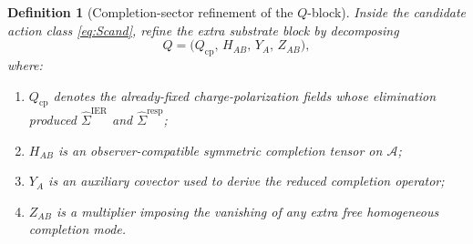 \documentclass[11pt]{article}
\newcommand{\Sub}{\mathcal A}
\newcommand{\BaseLift}{\widehat\Sigma^{\mathrm{IER}}}
\newcommand{\ResponseLift}{\widehat\Sigma^{\mathrm{resp}}}
\newcommand{\ChargeFields}{Q_{\mathrm{cp}}}
\newcommand{\GaugeAux}{Y}
\newcommand{\ModeAux}{Z}
\newtheorem{definition}{Definition}
\begin{document}
\begin{definition}[Completion-sector refinement of the \(Q\)-block]
\label{def:Qrefine}
Inside the candidate action class \eqref{eq:Scand}, refine the extra substrate block by decomposing
\begin{equation}
Q
=
\bigl(\ChargeFields,\,
H_{AB},\,
\GaugeAux_A,\,
\ModeAux_{AB}\bigr),
\label{eq:Qsplit}
\end{equation}
where:
\begin{enumerate}
    \item \(\ChargeFields\) denotes the already-fixed charge-polarization fields whose elimination produced \(\BaseLift\) and \(\ResponseLift\);
    \item \(H_{AB}\) is an observer-compatible symmetric completion tensor on \(\Sub\);
    \item \(\GaugeAux_A\) is an auxiliary covector used to derive the reduced completion operator;
    \item \(\ModeAux_{AB}\) is a multiplier imposing the vanishing of any extra free homogeneous completion mode.
\end{enumerate}
\end{definition}
\end{document}
